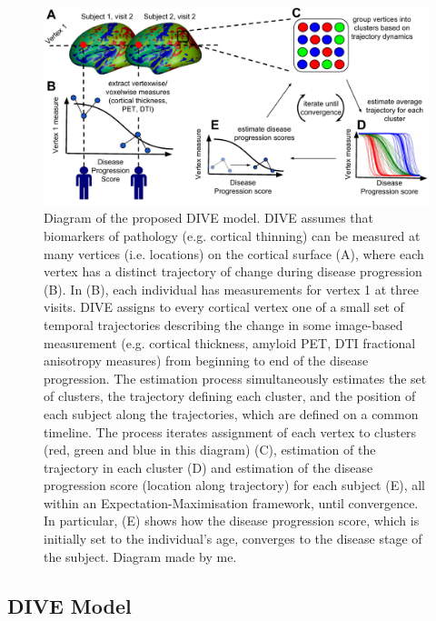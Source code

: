\begin{figure}
 \centering
 \includegraphics[width=\textwidth]{images/vwdpm_diagram.pdf}
%  
 \caption[Diagram of the proposed DIVE model.]{Diagram of the proposed DIVE model. DIVE assumes that biomarkers of pathology (e.g. cortical thinning) can be measured at many vertices (i.e. locations) on the cortical surface (A), where each vertex has a distinct trajectory of change during disease progression (B). In (B), each individual has measurements for vertex 1 at three visits. DIVE assigns to every cortical vertex one of a small set of temporal trajectories describing the change in some image-based measurement (e.g. cortical thickness, amyloid PET, DTI fractional anisotropy measures) from beginning to end of the disease progression. The estimation process simultaneously estimates the set of clusters, the trajectory defining each cluster, and the position of each subject along the trajectories, which are defined on a common timeline. The process iterates assignment of each vertex to clusters (red, green and blue in this diagram) (C), estimation of the trajectory in each cluster (D) and estimation of the disease progression score (location along trajectory) for  each subject (E), all within an Expectation-Maximisation framework, until convergence. In particular, (E) shows how the disease progression score, which is initially set to the individual's age, converges to the disease stage of the subject. Diagram made by me. }
 \label{fig:diveDiagram}
\end{figure}

\subsection{DIVE Model}
\label{sec:diveMod}

